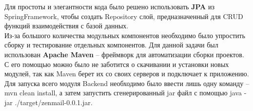 \documentclass{article}
\begin{document}
Для простоты и элегантности кода было решено использовать \textbf{JPA} из SpringFramework, чтобы создать Repository слой, предназначенный для CRUD функций взаимодействия с базой данных. \\

Из-за большого количества модульных компонентов необходимо было упростить сборку и тестирование отдельных компонентов. Для данной задачи был использован \textbf{Apache Maven} -- фреймворк для автоматизации сборки проектов. С его помощью можно было не заботится о скачивании и установки новых модулей, так как Maven берет их со своих серверов и подключает к приложению. Для запуска всего модуля Backend необходимо было ввести лишь одну команду -- mvn clean install, а затем запустить сгенерированный jar файл с помощью java -jar ./target/zenmail-0.0.1.jar. 
\end{document}
